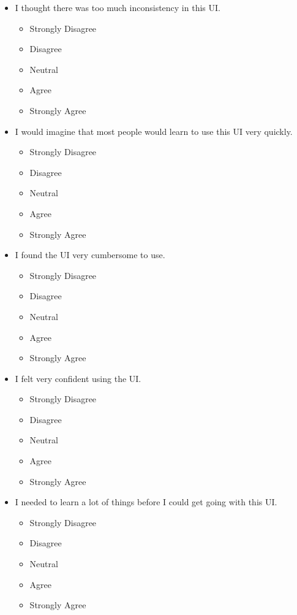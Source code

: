 \documentclass[doublespace,draft,nopageskip]{VTthesis} %
\begin{document}
\begin{itemize}
\begin{itemize}
        \item I thought there was too much inconsistency in this UI.
            \begin{itemize}
                \item Strongly Disagree
                \item Disagree
                \item Neutral
                \item Agree
                \item Strongly Agree
            \end{itemize}
        \item I would imagine that most people would learn to use this UI very quickly.
            \begin{itemize}
                \item Strongly Disagree
                \item Disagree
                \item Neutral
                \item Agree
                \item Strongly Agree
            \end{itemize}
        \item I found the UI very cumbersome to use.
            \begin{itemize}
                \item Strongly Disagree
                \item Disagree
                \item Neutral
                \item Agree
                \item Strongly Agree
            \end{itemize}
	\item I felt very confident using the UI.
            \begin{itemize}
                \item Strongly Disagree
                \item Disagree
                \item Neutral
                \item Agree
                \item Strongly Agree
            \end{itemize}
        \item I needed to learn a lot of things before I could get going with this UI.
            \begin{itemize}
                \item Strongly Disagree
                \item Disagree
                \item Neutral
                \item Agree
                \item Strongly Agree
            \end{itemize}
    \end{itemize}
\end{itemize}
\end{document}

